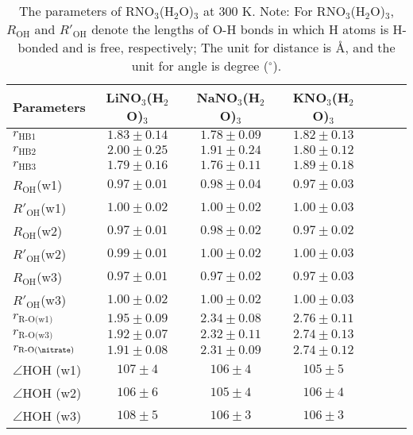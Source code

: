 \begin{table}
\centering
\caption{\label{tab:table_rnitrate_3w}%
The parameters of RNO$_3$(H$_2$O)$_3$ at 300 K. Note: For RNO$_3$(H$_2$O)$_3$, $R_\text{OH}$ and $R'_\text{OH}$ denote the lengths of O-H bonds in which H atoms is H-bonded and is free, respectively; The unit for distance is \AA, and the unit for angle is degree ($^\circ$).}
\begin{tabular}{l*{4}ccc}
Parameters & LiNO$_3$(H$_2$O)$_3$& NaNO$_3$(H$_2$O)$_3$ & KNO$_3$(H$_2$O)$_3$\\
\hline
$r_\text{HB1}$ & $1.83\pm0.14$ & $1.78\pm0.09$ & $1.82\pm0.13$\\
$r_\text{HB2}$ & $2.00\pm0.25$ & $1.91\pm0.24$ & $1.80\pm0.12$\\
$r_\text{HB3}$ &$1.79\pm0.16$ & $1.76\pm0.11$ & $1.89\pm0.18$\\
$R_\text{OH}$(w1) &$0.97\pm0.01$ &$0.98\pm0.04$ &$0.97\pm0.03$ \\
$R'_\text{OH}$(w1) &$1.00\pm0.02$ &$1.00\pm0.02$ & $1.00\pm0.03$ \\
$R_\text{OH} $(w2) &$0.97\pm0.01$ &$0.98\pm0.02$ &$0.97\pm0.02$ \\ 
$R'_\text{OH}$(w2) &$0.99\pm0.01$ &$1.00\pm0.02$ & $1.00\pm0.03$ \\
$R_\text{OH}$(w3) &$0.97\pm0.01$ & $0.97\pm0.02$&$0.97\pm0.03$ \\
$R'_\text{OH}$(w3) &$1.00\pm0.02$ &$1.00\pm0.02$ & $1.00\pm0.03$ \\
$r_\text{R-O(w1)}$ & $1.95\pm0.09$ & $2.34\pm0.08$ & $2.76\pm0.11$\\
$r_\text{R-O(w3)}$ & $1.92\pm0.07$ & $2.32\pm0.11$ & $2.74\pm0.13$\\
$r_\text{R-O(\nitrate)}$ & $1.91\pm0.08$ & $2.31\pm0.09$ & $2.74\pm0.12$ \\
$\angle$HOH (w1) &$107\pm4$ & $106\pm4$ &$105\pm5$ \\
$\angle$HOH (w2) &$106\pm6$ & $105\pm4$ &$106\pm4$ \\
$\angle$HOH (w3) &$108\pm5$ & $106\pm3$ &$106\pm3$ 
\end{tabular}
\end{table}
